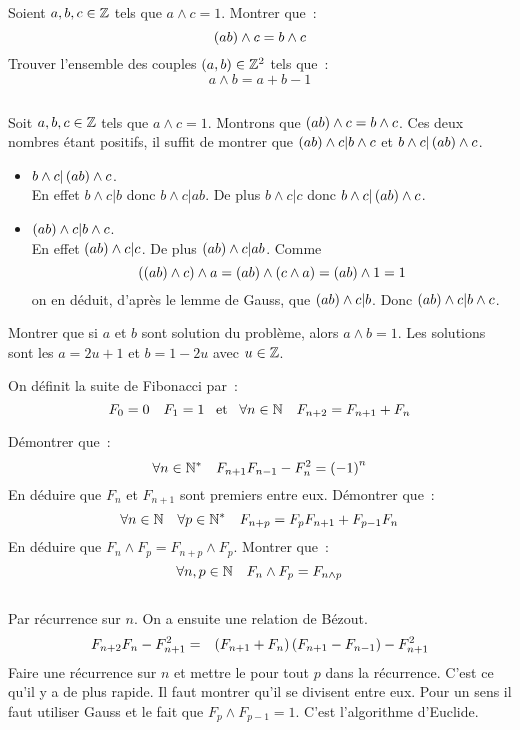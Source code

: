 \documentclass{magnolia}
\begin{document}
\begin{questions}
\question Soient $a,b,c\in\mathbb{Z}$ tels que $a\wedge c=1$. Montrer que~:
  \[\left(ab\right)\wedge c=b\wedge c\]
\question Trouver l'ensemble des couples $\left(a,b\right)\in\mathbb{Z}^2$ tels que~:
  \[a\wedge b=a+b-1\]
\end{questions}
\begin{sol}
$\quad$
\begin{questions}
\question Soit $a,b,c\in\mathbb{Z}$ tels que $a\wedge c=1$. Montrons que
  $\left(ab\right)\wedge c=b\wedge c$. Ces deux nombres étant positifs, il suffit de
  montrer que $\left(ab\right)\wedge c|b\wedge c$ et $b\wedge c|\left(ab\right)\wedge c$.
  \begin{itemize}
  \item $b\wedge c|\left(ab\right)\wedge c$.\\
    En effet $b\wedge c|b$ donc $b\wedge c|ab$. De plus $b\wedge c|c$ donc
    $b\wedge c|\left(ab\right)\wedge c$.
  \item $\left(ab\right)\wedge c|b\wedge c$.\\
    En effet $\left(ab\right)\wedge c|c$. De plus $\left(ab\right)\wedge c|ab$. Comme
    \[\left(\left(ab\right)\wedge c\right)\wedge a=\left(ab\right)\wedge\left(c\wedge a\right)=\left(ab\right)\wedge 1=1\]
    on en déduit, d'après le lemme de Gauss, que $\left(ab\right)\wedge c|b$. Donc
    $\left(ab\right)\wedge c|b\wedge c$.
  \end{itemize}
\question Montrer que si $a$ et $b$ sont solution du problème, alors $a\wedge b=1$.
  Les solutions sont les $a=2u+1$ et $b=1-2u$ avec $u\in\mathbb{Z}$.
\end{questions}
\end{sol}

On définit la suite de Fibonacci par~:
\[F_0=0 \quad F_1=1 \quad\!\text{et}\quad\! \forall n\in\mathbb{N} \quad F_{n+2}=F_{n+1}+F_n\]
\begin{questions}
\question Démontrer que~:
  \[\forall n\in{\mathbb{N}^*} \quad F_{n+1}F_{n-1}-F_n^2=\left(-1\right)^n\]
  En déduire que $F_n$ et $F_{n+1}$ sont premiers entre eux.
\question Démontrer que~:
  \[\forall n\in\mathbb{N} \quad \forall p\in{\mathbb{N}^*} \quad
    F_{n+p}=F_p F_{n+1}+F_{p-1}F_n\]
  En déduire que $F_n \wedge F_p = F_{n+p}\wedge F_p$.
\question Montrer que~:
  \[\forall n,p\in\mathbb{N} \quad F_n \wedge F_p = F_{n\wedge p}\]
\end{questions}
\begin{sol}
$\quad$
\begin{questions}
\question Par récurrence sur $n$. On a ensuite une relation de Bézout.
  \begin{eqnarray*}
  F_{n+2}F_n-F_{n+1}^2
  &=& \left(F_{n+1}+F_n\right)\left(F_{n+1}-F_{n-1}\right)-F_{n+1}^2
  \end{eqnarray*}
\question Faire une récurrence sur $n$ et mettre le \og pour tout $p$ \fg
  dans la récurrence. C'est ce qu'il y a de plus rapide.
  Il faut montrer qu'il se divisent entre eux. Pour un sens il faut utiliser
  Gauss et le fait que $F_p\wedge F_{p-1}=1$.
\question C'est l'algorithme d'Euclide.
\end{questions}
\end{sol}
\end{document}
